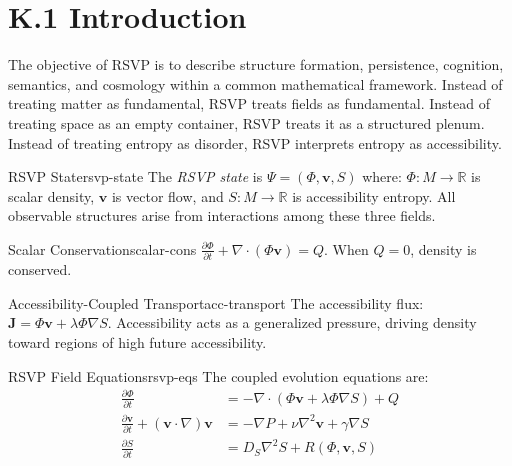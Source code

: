 
\section*{K.1 Introduction}

The objective of RSVP is to describe structure formation, persistence,
cognition, semantics, and cosmology within a common mathematical framework.
Instead of treating matter as fundamental, RSVP treats fields as fundamental.
Instead of treating space as an empty container, RSVP treats it as a
structured plenum. Instead of treating entropy as disorder, RSVP interprets
entropy as accessibility.

\begin{definition}{RSVP State}{rsvp-state}
  The \emph{RSVP state} is $\Psi = (\Phi, \mathbf{v}, S)$ where:
  $\Phi : M \to \mathbb{R}$ is scalar density,
  $\mathbf{v}$ is vector flow, and $S : M \to \mathbb{R}$ is
  accessibility entropy. All observable structures arise from interactions
  among these three fields.
\end{definition}

\begin{definition}{Scalar Conservation}{scalar-cons}
  $\frac{\partial \Phi}{\partial t} + \nabla \cdot (\Phi \mathbf{v}) = Q$.
  When $Q = 0$, density is conserved.
\end{definition}

\begin{definition}{Accessibility-Coupled Transport}{acc-transport}
  The accessibility flux:
  $\mathbf{J} = \Phi \mathbf{v} + \lambda \Phi \nabla S$.
  Accessibility acts as a generalized pressure, driving density
  toward regions of high future accessibility.
\end{definition}

\begin{definition}{RSVP Field Equations}{rsvp-eqs}
  The coupled evolution equations are:
  \begin{align}
    \frac{\partial \Phi}{\partial t} &= -\nabla \cdot (\Phi \mathbf{v} + \lambda\Phi\nabla S) + Q \\
    \frac{\partial \mathbf{v}}{\partial t} + (\mathbf{v}\cdot\nabla)\mathbf{v} &=
      -\nabla P + \nu\nabla^2\mathbf{v} + \gamma\nabla S \\
    \frac{\partial S}{\partial t} &= D_S \nabla^2 S + R(\Phi,\mathbf{v},S)
  \end{align}
\end{definition}

